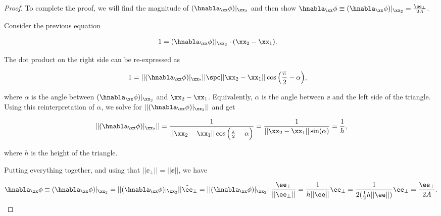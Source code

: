 \begin{proof}
    To complete the proof, we will find the magnitude of $(\hnabla_\xx \phi)|_{\xx_2}$ and then show $\hnabla_\xx \phi \equiv (\hnabla_\xx \phi)|_{\xx_2} = \frac{\ee_\perp}{2A}$.
    
    Consider the previous equation
    
    \begin{align*}
        1 &= (\hnabla_\xx \phi)|_{\xx_2} \cdot (\xx_2 - \xx_1).
    \end{align*}
    
    The dot product on the right side can be re-expressed as
    
    \begin{align*}
        1 &= ||(\hnabla_\xx \phi)|_{\xx_2}|| \spc ||\xx_2 - \xx_1|| \cos \Big( \frac{\pi}{2} - \alpha \Big),
    \end{align*}
    
    where $\alpha$ is the angle between $(\hnabla_\xx \phi)|_{\xx_2}$ and $\xx_2 - \xx_1$. Equivalently, $\alpha$ is the angle between $\ee$ and the left side of the triangle. Using this reinterpretation of $\alpha$, we solve for $||(\hnabla_\xx \phi)|_{\xx_2}||$ and get
    
    \begin{align*}
        ||(\hnabla_\xx \phi)|_{\xx_2}|| 
        = \frac{1}{||\xx_2 - \xx_1|| \cos\Big( \frac{\pi}{2} - \alpha \Big)}
        = \frac{1}{||\xx_2 - \xx_1|| \sin(\alpha)} = \frac{1}{h},
    \end{align*}
    
    where $h$ is the height of the triangle. 
    
    Putting everything together, and using that $||\ee_\perp|| = ||\ee||$, we have
    
    \begin{align*}
        \hnabla_\xx \phi \equiv (\hnabla_\xx \phi)|_{\xx_2} 
        = ||(\hnabla_\xx \phi)|_{\xx_2}|| \hat{\ee}_\perp 
        = ||(\hnabla_\xx \phi)|_{\xx_2}|| \frac{\ee_\perp}{||\ee_\perp||}
        = \frac{1}{h ||\ee||} \ee_\perp
        = \frac{1}{2(\frac{1}{2} h ||\ee||)} \ee_\perp
        = \frac{\ee_\perp}{2A}.
    \end{align*}
    
    
    

\end{proof}
